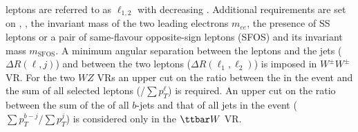 \begin{table}[t!]
{leptons are referred to as $\ell_{1,2}$ with decreasing \pt. Additional requirements are set 
on \met, \meff, the invariant mass of the two leading electrons $m_{ee}$, the presence of SS 
leptons or a pair of same-flavour opposite-sign leptons (SFOS) and its invariant mass $m_\text{SFOS}$. 
A minimum angular separation between the leptons and the jets ($\Delta R (\ell, j)$) and between the two 
leptons ($\Delta R (\ell_{1}, \ell_2)$) is imposed in $W^\pm W^\pm$ VR. For the two $WZ$ VRs an upper cut 
on the ratio between the \met in the event and the sum of all selected leptons \pt (\met/$\sum{p_T^\ell}$) is required. 
An upper cut on the ratio between the sum of the \pt of all $b$-jets and that of all jets in the event ($\sum p_T^{b-j} / \sum{p_T^{j}}$) is 
considered only in the $\ttbar W$ VR.
}
\label{tab:VRdef}
\end{table}

